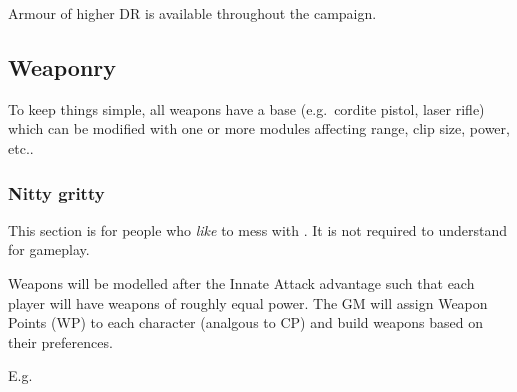 Armour of higher DR is available throughout the campaign.

\subsection{Weaponry}
To keep things simple, all weapons have a base (e.g.~cordite pistol, laser
rifle) which can be modified with one or more modules affecting range, clip
size, power, etc..



\subsubsection{Nitty gritty}
\label{sec:nitty-gritty}

\begin{tcolorbox}[title={Warning}]
  This section is for people who \emph{like} to mess with \gurps. It is not
  required to understand for gameplay.
\end{tcolorbox}

Weapons will be modelled after the Innate Attack advantage such that each player
will have weapons of roughly equal power. The GM will assign Weapon Points (WP)
to each character (analgous to CP) and build weapons based on their preferences.

E.g.

